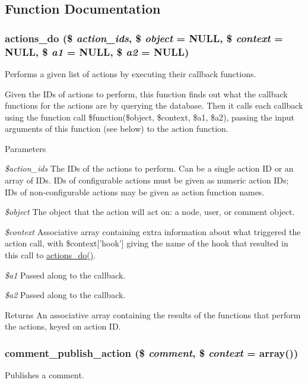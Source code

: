 \subsection{Function Documentation}
\hypertarget{group__actions_gacfece93b3453da7c572057dde3453122}{
\subsubsection[{actions\_\-do}]{\setlength{\rightskip}{0pt plus 5cm}actions\_\-do (\$ {\em action\_\-ids}, \/  \$ {\em object} = {\ttfamily NULL}, \/  \$ {\em context} = {\ttfamily NULL}, \/  \$ {\em a1} = {\ttfamily NULL}, \/  \$ {\em a2} = {\ttfamily NULL})}}
\label{group__actions_gacfece93b3453da7c572057dde3453122}
Performs a given list of actions by executing their callback functions.

Given the IDs of actions to perform, this function finds out what the callback functions for the actions are by querying the database. Then it calls each callback using the function call \$function(\$object, \$context, \$a1, \$a2), passing the input arguments of this function (see below) to the action function.


\begin{DoxyParams}{Parameters}
\item[{\em \$action\_\-ids}]The IDs of the actions to perform. Can be a single action ID or an array of IDs. IDs of configurable actions must be given as numeric action IDs; IDs of non-\/configurable actions may be given as action function names. \item[{\em \$object}]The object that the action will act on: a node, user, or comment object. \item[{\em \$context}]Associative array containing extra information about what triggered the action call, with \$context\mbox{[}'hook'\mbox{]} giving the name of the hook that resulted in this call to \hyperlink{group__actions_gacfece93b3453da7c572057dde3453122}{actions\_\-do()}. \item[{\em \$a1}]Passed along to the callback. \item[{\em \$a2}]Passed along to the callback.\end{DoxyParams}
\begin{DoxyReturn}{Returns}
An associative array containing the results of the functions that perform the actions, keyed on action ID. 
\end{DoxyReturn}
\hypertarget{group__actions_gab4b880ee11ea9075bf10e6e29d21ba25}{
\subsubsection[{comment\_\-publish\_\-action}]{\setlength{\rightskip}{0pt plus 5cm}comment\_\-publish\_\-action (\$ {\em comment}, \/  \$ {\em context} = {\ttfamily array()})}}
\label{group__actions_gab4b880ee11ea9075bf10e6e29d21ba25}
Publishes a comment.


